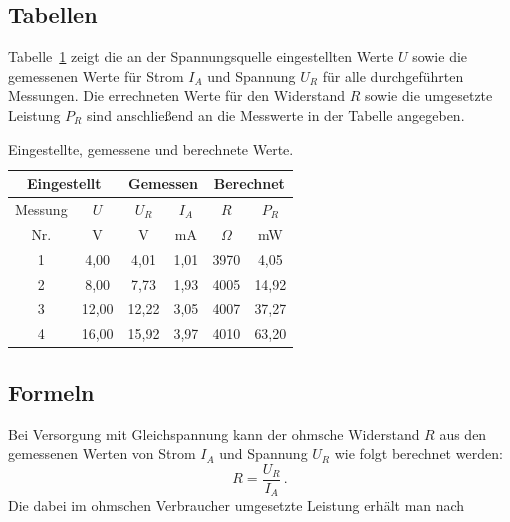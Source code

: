\documentclass[12pt,a4paper,ngerman]{article}
\begin{document}
\subsection{Tabellen}
%
Tabelle~\ref{tab:messwerte} zeigt die an der Spannungsquelle eingestellten Werte $U$ sowie die gemessenen Werte für Strom $I_A$ und Spannung $U_R$ für alle durchgeführten Messungen. Die errechneten Werte für den Widerstand $R$ sowie die umgesetzte Leistung $P_R$ sind anschließend an die Messwerte in der Tabelle angegeben.

\pagebreak
\begin{table}[!htp]
	\begin{center}
		\begin{tabular}
			{| c || c || c | c || c | c |}   %
			\hline
			\multicolumn{2}{|c||}{Eingestellt} &
			\multicolumn{2}{c||}{Gemessen} &
			\multicolumn{2}{c|}{Berechnet} \\ \hline
			Messung & $U$ & $U_{R}$  & $I_{A}$& $R$      & $P_R$     \\ \hline
			Nr.     &  V  &  V       &  mA    & $\Omega$ &  mW       \\ \hline\hline
			1       & 4,00&  4,01    & 1,01   &  3970    &  4,05     \\ \hline
			2       & 8,00&  7,73    & 1,93   &  4005    &  14,92    \\ \hline
			3       &12,00& 12,22    & 3,05   &  4007    &  37,27    \\ \hline
			4       &16,00& 15,92    & 3,97   &  4010    &  63,20    \\
			\hline
		\end{tabular}
		\caption{Eingestellte, gemessene und berechnete Werte.\label{tab:messwerte}}
	\end{center}
\end{table}

\subsection{Formeln}
%
Bei Versorgung mit Gleichspannung kann der ohmsche Widerstand $R$ aus den gemessenen Werten von Strom $I_A$ und Spannung $U_R$ wie folgt berechnet werden:
\begin{equation}\label{eq:widerstand}
	R = \frac{U_R}{I_A}\,.
\end{equation}
Die dabei im ohmschen Verbraucher umgesetzte Leistung erhält man nach 

\end{document}
